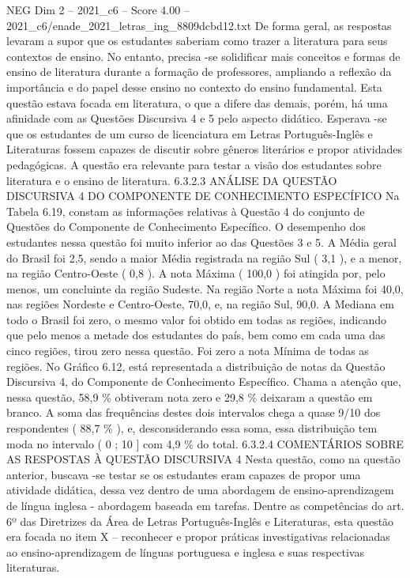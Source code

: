 \begin{textsample}{NEG Dim 2 – 2021\_c6 – Score 4.00 – 2021\_c6/enade\_2021\_letras\_ing\_8809dcbd12.txt}
De forma geral, as respostas levaram a supor que os estudantes saberiam como trazer a literatura para seus contextos de ensino.
No entanto, precisa -se solidificar mais conceitos e formas de ensino de literatura durante a formação de professores, ampliando a reflexão da importância e do papel desse ensino no contexto do ensino fundamental.
Esta questão estava focada em literatura, o que a difere das demais, porém, há uma afinidade com as Questões Discursiva 4 e 5 pelo aspecto didático.
Esperava -se que os estudantes de um curso de licenciatura em Letras Português-Inglês e Literaturas fossem capazes de discutir sobre gêneros literários e propor atividades pedagógicas.
A questão era relevante para testar a visão dos estudantes sobre literatura e o ensino de literatura. 6.3.2.3 ANÁLISE DA QUESTÃO DISCURSIVA 4 DO COMPONENTE DE CONHECIMENTO ESPECÍFICO Na Tabela 6.19, constam as informações relativas à Questão 4 do conjunto de Questões do Componente de Conhecimento Específico.
O desempenho dos estudantes nessa questão foi muito inferior ao das Questões 3 e 5.
A Média geral do Brasil foi 2,5, sendo a maior Média registrada na região Sul ( 3,1 ), e a menor, na região Centro-Oeste ( 0,8 ).
A nota Máxima ( 100,0 ) foi atingida por, pelo menos, um concluinte da região Sudeste.
Na região Norte a nota Máxima foi 40,0, nas regiões Nordeste e Centro-Oeste, 70,0, e, na região Sul, 90,0.
A Mediana em todo o Brasil foi zero, o mesmo valor foi obtido em todas as regiões, indicando que pelo menos a metade dos estudantes do país, bem como em cada uma das cinco regiões, tirou zero nessa questão.
Foi zero a nota Mínima de todas as regiões.
No Gráfico 6.12, está representada a distribuição de notas da Questão Discursiva 4, do Componente de Conhecimento Específico.
Chama a atenção que, nessa questão, 58,9 \% obtiveram nota zero e 29,8 \% deixaram a questão em branco.
A soma das frequências destes dois intervalos chega a quase 9/10 dos respondentes ( 88,7 \% ), e, desconsiderando essa soma, essa distribuição tem moda no intervalo ( 0 ; 10 ] com 4,9 \% do total. 6.3.2.4 COMENTÁRIOS SOBRE AS RESPOSTAS À QUESTÃO DISCURSIVA 4 Nesta questão, como na questão anterior, buscava -se testar se os estudantes eram capazes de propor uma atividade didática, dessa vez dentro de uma abordagem de ensino-aprendizagem de língua inglesa - abordagem baseada em tarefas.
Dentre as competências do art. 6º das Diretrizes da Área de Letras Português-Inglês e Literaturas, esta questão era focada no item X – reconhecer e propor práticas investigativas relacionadas ao ensino-aprendizagem de línguas portuguesa e inglesa e suas respectivas literaturas.

\end{textsample}
